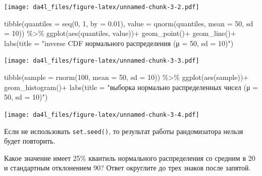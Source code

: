 \documentclass[
]{book}
\makeatletter
\newenvironment{Shaded}{\begin{snugshade}}{\end{snugshade}}
\newcommand{\AttributeTok}[1]{\textcolor[rgb]{0.77,0.63,0.00}{#1}}
\newcommand{\DecValTok}[1]{\textcolor[rgb]{0.00,0.00,0.81}{#1}}
\newcommand{\FloatTok}[1]{\textcolor[rgb]{0.00,0.00,0.81}{#1}}
\newcommand{\FunctionTok}[1]{\textcolor[rgb]{0.00,0.00,0.00}{#1}}
\newcommand{\NormalTok}[1]{#1}
\newcommand{\SpecialCharTok}[1]{\textcolor[rgb]{0.00,0.00,0.00}{#1}}
\newcommand{\StringTok}[1]{\textcolor[rgb]{0.31,0.60,0.02}{#1}}
\newenvironment{kframe}{%
    \medskip{}
    \setlength{\fboxsep}{.8em}
    \def\at@end@of@kframe{}%
    \ifinner\ifhmode%
    \def\at@end@of@kframe{\end{minipage}}%
    \begin{minipage}{\columnwidth}%
    \fi\fi%
    \def\FrameCommand##1{\hskip\@totalleftmargin \hskip-\fboxsep
    \colorbox{shadecolor}{##1}\hskip-\fboxsep
        \hskip-\linewidth \hskip-\@totalleftmargin \hskip\columnwidth}%
    \MakeFramed {\advance\hsize-\width
      \@totalleftmargin\z@ \linewidth\hsize
      \@setminipage}}%
  {\par\unskip\endMakeFramed%
    \at@end@of@kframe}
\newenvironment{rmdblock}[1]
  {
    \begin{itemize}
    \renewcommand{\labelitemi}{
      \raisebox{-.7\height}[0pt][0pt]{
        {\setkeys{Gin}{width=3em,keepaspectratio}\texttt{[image: images/\#1]}}
        }
        }
        \setlength{\fboxsep}{1em}
        \begin{kframe}
        \item
      }
      {
        \end{kframe}
        \end{itemize}
      }
\newenvironment{rmdtask}
      {\begin{rmdblock}{task}}
      {\end{rmdblock}}
\makeatother
\begin{document}
\texttt{[image: da4l\_files/figure-latex/unnamed-chunk-3-2.pdf]}

\begin{Shaded}
\begin{Highlighting}[]
\FunctionTok{tibble}\NormalTok{(}\AttributeTok{quantiles =} \FunctionTok{seq}\NormalTok{(}\DecValTok{0}\NormalTok{, }\DecValTok{1}\NormalTok{, }\AttributeTok{by =} \FloatTok{0.01}\NormalTok{),}
       \AttributeTok{value =} \FunctionTok{qnorm}\NormalTok{(quantiles, }\AttributeTok{mean =} \DecValTok{50}\NormalTok{, }\AttributeTok{sd =} \DecValTok{10}\NormalTok{)) }\SpecialCharTok{\%\textgreater{}\%} 
  \FunctionTok{ggplot}\NormalTok{(}\FunctionTok{aes}\NormalTok{(quantiles, value))}\SpecialCharTok{+}
  \FunctionTok{geom\_point}\NormalTok{()}\SpecialCharTok{+}
  \FunctionTok{geom\_line}\NormalTok{()}\SpecialCharTok{+}
  \FunctionTok{labs}\NormalTok{(}\AttributeTok{title =} \StringTok{"inverse CDF нормального распределения (μ = 50, sd = 10)"}\NormalTok{)}
\end{Highlighting}
\end{Shaded}

\texttt{[image: da4l\_files/figure-latex/unnamed-chunk-3-3.pdf]}

\begin{Shaded}
\begin{Highlighting}[]
\FunctionTok{tibble}\NormalTok{(}\AttributeTok{sample =} \FunctionTok{rnorm}\NormalTok{(}\DecValTok{100}\NormalTok{, }\AttributeTok{mean =} \DecValTok{50}\NormalTok{, }\AttributeTok{sd =} \DecValTok{10}\NormalTok{)) }\SpecialCharTok{\%\textgreater{}\%} 
  \FunctionTok{ggplot}\NormalTok{(}\FunctionTok{aes}\NormalTok{(sample))}\SpecialCharTok{+}
  \FunctionTok{geom\_histogram}\NormalTok{()}\SpecialCharTok{+}
  \FunctionTok{labs}\NormalTok{(}\AttributeTok{title =} \StringTok{"выборка нормально распределенных чисел (μ = 50, sd = 10)"}\NormalTok{)}
\end{Highlighting}
\end{Shaded}

\texttt{[image: da4l\_files/figure-latex/unnamed-chunk-3-4.pdf]}

Если не использовать \texttt{set.seed()}, то результат работы рандомизатора нельзя будет повторить.

\begin{rmdtask}
Какое значение имеет 25\% квантиль нормального распределения со средним
в 20 и стандартным отклонением 90? Ответ округлите до трех знаков после
запятой.
\end{rmdtask}
\end{document}
